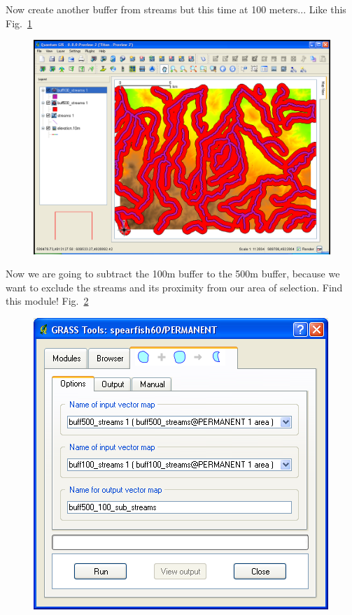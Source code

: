 Now create another buffer from streams but this time at 100 meters...
Like this Fig.~\ref{fig:qgis038}

\begin{figure}[htbp]
   \centering
   \includegraphics[scale=0.2]{qgis038.png}
   \caption{}
   \label{fig:qgis038}
\end{figure}

Now we are going to subtract the 100m buffer to the 500m buffer, because
we want to exclude the streams and its proximity from our area of
selection. Find this module! Fig.~\ref{fig:qgis039}

\begin{figure}[htbp]
   \centering
   \includegraphics[scale=0.35]{qgis039.png}
   \caption{}
   \label{fig:qgis039}
\end{figure}

